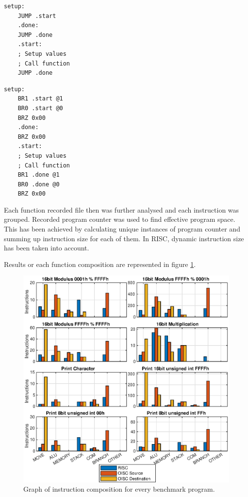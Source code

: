 \begin{blockpage}
	\begin{lstlisting}[frame=single, caption={RISC assembly frame for executring tests}, emph={setup,start,done} label=list:asm_risc_test]
	setup:
	JUMP .start
	.done:
	JUMP .done
	.start:
	; Setup values
	; Call function
	JUMP .done
	\end{lstlisting}
\end{blockpage}

\begin{blockpage}
	\begin{lstlisting}[frame=single, caption={OISC assembly frame for executring tests}, emph={setup,start,done} label={list:asm_oisc_test}]
	setup:
	BR1 .start @1
	BR0 .start @0
	BRZ 0x00
	.done:
	BRZ 0x00
	.start:
	; Setup values
	; Call function
	BR1 .done @1
	BR0 .done @0
	BRZ 0x00
	\end{lstlisting}
\end{blockpage}

Each function recorded file then was further analysed and each instruction was grouped. Recorded program counter was used to find effective program space. This has been achieved by calculating unique instances of program counter and summing up instruction size for each of them. In RISC, dynamic instruction size has been taken into account. 

Results or each function composition are represented in figure \ref{fig:instr_comp}. 
\begin{figure}[t]
	\centering
	\includegraphics[width=\linewidth]{../tests/instr_comp.eps}
	\caption{Graph of instruction composition for every benchmark program.}
	\label{fig:instr_comp}
\end{figure}

